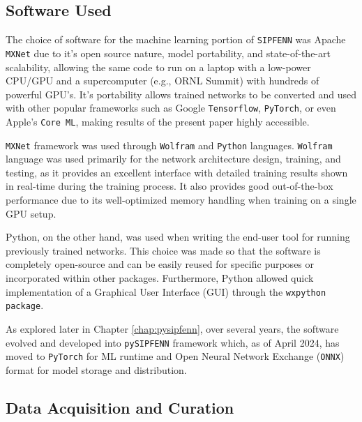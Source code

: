 \subsection{Software Used} \label{sipfenn:sssec:SoftwareUsed}

The choice of software for the machine learning portion of \texttt{SIPFENN} was Apache \texttt{MXNet} \cite{ChenMXNet:Systems} due to it's open source nature, model portability, and state-of-the-art scalability, allowing the same code to run on a laptop with a low-power CPU/GPU and a supercomputer (e.g., ORNL Summit) with hundreds of powerful GPU's. It's portability allows trained networks to be converted and used with other popular frameworks such as Google \texttt{Tensorflow}, \texttt{PyTorch}, or even Apple's \texttt{Core ML}, making results of the present paper highly accessible.

\texttt{MXNet} framework was used through \texttt{Wolfram} and \texttt{Python} languages. \texttt{Wolfram} language was used primarily for the network architecture design, training, and testing, as it provides an excellent interface with detailed training results shown in real-time during the training process. It also provides good out-of-the-box performance due to its well-optimized memory handling when training on a single GPU setup. 

Python, on the other hand, was used when writing the end-user tool for running previously trained networks. This choice was made so that the software is completely open-source and can be easily reused for specific purposes or incorporated within other packages. Furthermore, Python allowed quick implementation of a Graphical User Interface (GUI) through the \texttt{wxpython package}.

As explored later in Chapter \ref{chap:pysipfenn}, over several years, the software evolved and developed into \texttt{pySIPFENN} framework which, as of April 2024, has moved to \texttt{PyTorch} for ML runtime and Open Neural Network Exchange (\texttt{ONNX}) format \cite{Bai2019ONNX:Exchange} for model storage and distribution.

\subsection{Data Acquisition and Curation} \label{sipfenn:sssec:Data}


